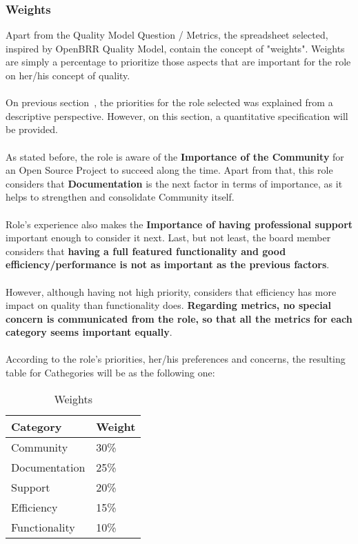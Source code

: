 \documentclass[11pt]{article}
\begin{document}
\subsubsection{Weights}
Apart from the Quality Model Question / Metrics, the spreadsheet selected, inspired by OpenBRR Quality Model, contain the concept of "weights". Weights are simply a percentage to prioritize those aspects that are important for the role on her/his concept of quality. \\
\\
On previous section~, the priorities for the role selected was explained from a descriptive perspective. However, on this section, a quantitative specification will be provided.\\
\\
As stated before, the role is aware of the \textbf{Importance of the Community} for an Open Source Project to succeed along the time. Apart from that, this role considers that \textbf{Documentation} is the next factor in terms of importance, as it helps to strengthen and consolidate Community itself.\\
\\
Role's experience also makes the \textbf{Importance of having professional support} important enough to consider it next. Last, but not least, the board member considers that \textbf{having a full featured functionality and good efficiency/performance is not as important as the previous factors}.\\
\\
However, although having not high priority, considers that efficiency has more impact on quality than functionality does. \textbf{Regarding metrics, no special concern is communicated from the role, so that all the metrics for each category seems important equally}.\\
\\
According to the role's priorities, her/his preferences and concerns, the resulting table for Cathegories will be as the following one:
\begin{table}[H]
  \begin{center}
    \begin{tabular}{ | l | l | }
    \hline
    Category & Weight \\
    \hline
    Community & 30\%\\
    Documentation & 25\% \\
    Support & 20\% \\
    Efficiency & 15\% \\
    Functionality & 10\% \\
    \hline
    \end{tabular}
    \caption{Weights}
    \label{tab:weights}
  \end{center}
\end{table}
\end{document}
